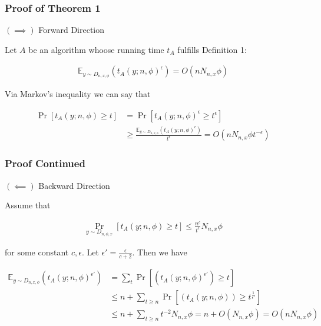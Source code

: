 \begin{frame}
    \frametitle{Proof of Theorem 1}

    $(\implies)$ Forward Direction

    Let $A$ be an algorithm whoose running time $t_A$ fulfills Definition 1:

    \begin{align*}
        \mathbb{E}_{y \sim D_{n, x, \phi}} \left(t_A(y; n, \phi) ^{\epsilon}\right) = O(nN_{n,x}\phi)
    \end{align*}

    Via Markov's inequality we can say that

    \begin{align*}
        \Pr[t_A(y; n, \phi) \geq t] & = \Pr[t_A(y; n, \phi)^\epsilon \geq t^\epsilon]                                                                      \\
                                    & \geq \frac{\mathbb{E}_{y \sim D_{n, x, \phi}}(t_A(y; n, \phi)^\epsilon)}{t^\epsilon} = O(nN_{n,x}\phi t^{-\epsilon})
    \end{align*}

\end{frame}

\begin{frame}
    \frametitle{Proof Continued}

    $(\impliedby)$ Backward Direction

    Assume that

    \begin{align*}
        \Pr_{y \sim D_{n, \phi, x}}[t_A(y;n, \phi) \geq t] \leq \frac{n^c}{t^{\epsilon}} N_{n,x} \phi
    \end{align*}

    for some constant $c, \epsilon$. Let $\epsilon' = \frac{\epsilon}{c + 2}$. Then
    we have

    \begin{align*}
        \mathbb{E}_{y \sim D_{n, x, \phi}}\left(t_A(y; n, \phi) ^{\epsilon'}\right) & = \displaystyle\sum_{t} \Pr\left[\left(t_A(y; n, \phi) ^{\epsilon'}\right) \geq t\right]                        \\
                                                                                    & \leq n + \displaystyle\sum_{t \geq n} \Pr\left[\left(t_A(y; n, \phi)\right) \geq t^{\frac{1}{\epsilon'}}\right] \\
                                                                                    & \leq n + \displaystyle\sum_{t \geq n} t^{-2}N_{n, x} \phi = n + O(N_{n, x} \phi) = O(nN_{n, x} \phi)
    \end{align*}

\end{frame}

